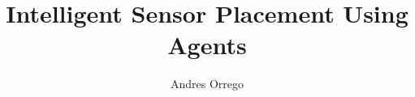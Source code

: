 \documentclass{sig-alternate}
\begin{document}
\title{Intelligent Sensor Placement Using Agents}


\author{
	\alignauthor Andres Orrego\\
	\\
	\\
}

\maketitle










%
%
\end{document}
